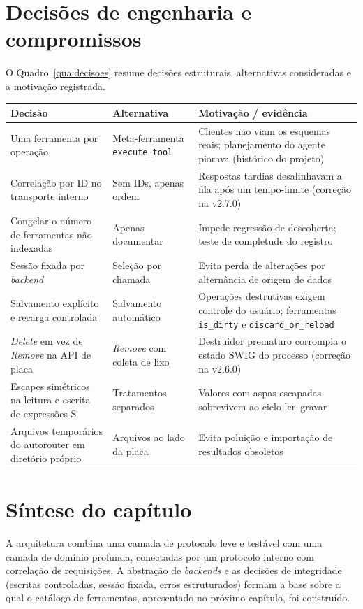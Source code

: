\section{Decisões de engenharia e compromissos}

O Quadro~\ref{qua:decisoes} resume decisões estruturais, alternativas
consideradas e a motivação registrada.

\begin{quadro}[htbp]
\centering
\small
\caption{Decisões de engenharia e compromissos.}
\label{qua:decisoes}
\begin{tabular}{@{}p{3.6cm}p{3.6cm}p{6.7cm}@{}}
\toprule
\textbf{Decisão} & \textbf{Alternativa} & \textbf{Motivação / evidência} \\
\midrule
Uma ferramenta por operação & Meta-ferramenta \texttt{execute\_tool} & Clientes não viam os esquemas reais; planejamento do agente piorava (histórico do projeto) \\
Correlação por ID no transporte interno & Sem IDs, apenas ordem & Respostas tardias desalinhavam a fila após um tempo-limite (correção na v2.7.0) \\
Congelar o número de ferramentas não indexadas & Apenas documentar & Impede regressão de descoberta; teste de completude do registro \\
Sessão fixada por \emph{backend} & Seleção por chamada & Evita perda de alterações por alternância de origem de dados \\
Salvamento explícito e recarga controlada & Salvamento automático & Operações destrutivas exigem controle do usuário; ferramentas \texttt{is\_dirty} e \texttt{discard\_or\_reload} \\
\emph{Delete} em vez de \emph{Remove} na API de placa & \emph{Remove} com coleta de lixo & Destruidor prematuro corrompia o estado SWIG do processo (correção na v2.6.0) \\
Escapes simétricos na leitura e escrita de expressões-S & Tratamentos separados & Valores com aspas escapadas sobrevivem ao ciclo ler--gravar \\
Arquivos temporários do autorouter em diretório próprio & Arquivos ao lado da placa & Evita poluição e importação de resultados obsoletos \\
\bottomrule
\end{tabular}
\end{quadro}

\section{Síntese do capítulo}

A arquitetura combina uma camada de protocolo leve e testável com uma camada
de domínio profunda, conectadas por um protocolo interno com correlação de
requisições. A abstração de \emph{backends} e as decisões de integridade
(escritas controladas, sessão fixada, erros estruturados) formam a base sobre
a qual o catálogo de ferramentas, apresentado no próximo capítulo, foi
construído.
